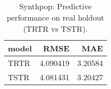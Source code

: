 \begin{table}

\caption{\label{tab:tab:synthpop:predparity}Synthpop: Predictive performance on real holdout (TRTR vs TSTR).}
\centering
\begin{tabular}[t]{lrr}
\toprule
model & RMSE & MAE\\
\midrule
TRTR & 4.090419 & 3.20584\\
TSTR & 4.081431 & 3.20427\\
\bottomrule
\end{tabular}
\end{table}